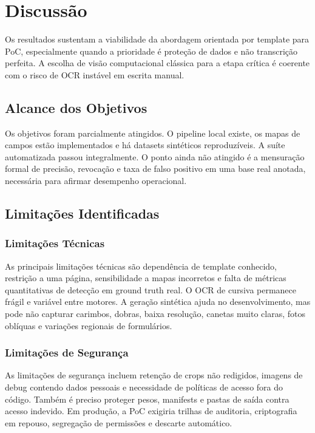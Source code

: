 \documentclass[12pt,a4paper]{article}
\begin{document}
\section{Discussão}
\label{sec:discussao}

Os resultados sustentam a viabilidade da abordagem orientada por template para PoC, especialmente quando a prioridade é proteção de dados e não transcrição perfeita. A escolha de visão computacional clássica para a etapa crítica é coerente com o risco de OCR instável em escrita manual.

\subsection{Alcance dos Objetivos}

Os objetivos foram parcialmente atingidos. O pipeline local existe, os mapas de campos estão implementados e há datasets sintéticos reproduzíveis. A suíte automatizada passou integralmente. O ponto ainda não atingido é a mensuração formal de precisão, revocação e taxa de falso positivo em uma base real anotada, necessária para afirmar desempenho operacional.

\subsection{Limitações Identificadas}

\subsubsection{Limitações Técnicas}
As principais limitações técnicas são dependência de template conhecido, restrição a uma página, sensibilidade a mapas incorretos e falta de métricas quantitativas de detecção em ground truth real. O OCR de cursiva permanece frágil e variável entre motores. A geração sintética ajuda no desenvolvimento, mas pode não capturar carimbos, dobras, baixa resolução, canetas muito claras, fotos oblíquas e variações regionais de formulários.

\subsubsection{Limitações de Segurança}
As limitações de segurança incluem retenção de crops não redigidos, imagens de debug contendo dados pessoais e necessidade de políticas de acesso fora do código. Também é preciso proteger pesos, manifests e pastas de saída contra acesso indevido. Em produção, a PoC exigiria trilhas de auditoria, criptografia em repouso, segregação de permissões e descarte automático.
\end{document}
